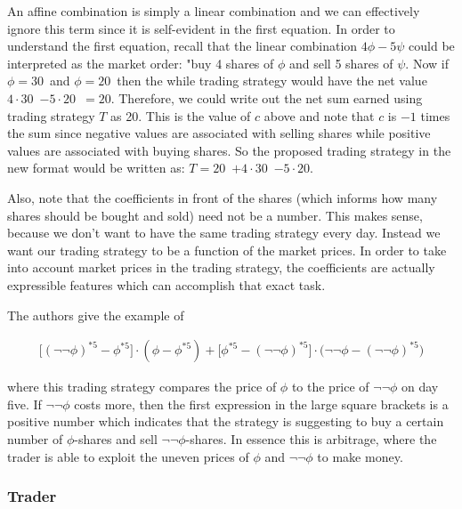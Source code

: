 \documentclass{article}
\begin{document}
An affine combination is simply a linear combination and we can effectively ignore this term since it is self-evident in the first equation. In order to understand the first equation, recall that the linear combination $4\phi-5\psi$ could be interpreted as the market order: "buy 4 shares of $\phi$ and sell 5 shares of $\psi$. Now if $\phi = 30$\textcent \ and $\phi = 20$\textcent \ then the while trading strategy would have the net value $4 \cdot 30$\textcent \ $-5 \cdot 20$\textcent \ $= 20$\textcent. Therefore, we could write out the net sum earned using trading strategy $T$ as 20\textcent. This is the value of $c$ above and note that $c$ is $-1$ times the sum since negative values are associated with selling shares while positive values are associated with buying shares. So the proposed trading strategy in the new format would be written as: $T = 20$\textcent \  $+ 4 \cdot 30$\textcent \ $-5 \cdot 20$\textcent.

 Also, note that the coefficients in front of the shares (which informs how many shares should be bought and sold) need not be a number. This makes sense, because we don't want to have the same trading strategy every day. Instead we want our trading strategy to be a function of the market prices. In order to take into account market prices in the trading strategy, the coefficients are actually expressible features which can accomplish that exact task.
 
 The authors give the example of 
 
 \begin{align*}
\bigg[ (\neg\neg\phi)^{*5} -\phi^{*5} \bigg] \cdot (\phi -\phi^{*5}) + \bigg[ \phi^{*5} -(\neg\neg\phi)^{*5} \bigg] \cdot \bigg( \neg\neg\phi-(\neg\neg\phi)^{*5} \bigg)
\end{align*}

where this trading strategy compares the price of $\phi$ to the price of $\neg\neg\phi$ on day five. If $\neg\neg\phi$ costs more, then the first expression in the large square brackets is a positive number which indicates that the strategy is suggesting to buy a certain number of $\phi$-shares and sell $\neg\neg\phi$-shares. In essence this is arbitrage, where the trader is able to exploit the uneven prices of $\phi$ and $\neg\neg\phi$ to make money.

\subsubsection{Trader} 

\noindent{}
\\
\end{document}
